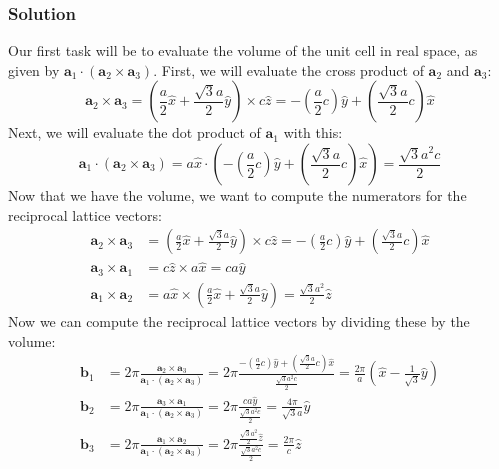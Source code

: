 \documentclass[12pt]{article}
\begin{document}
\subsubsection{Solution}
Our first task will be to evaluate the volume of the unit cell in real space, as given by $\mathbf{a}_1 \cdot\left(\mathbf{a}_2 \times \mathbf{a}_3\right)$. First, we will evaluate the cross product of $\mathbf{a}_2$ and $\mathbf{a}_3$:
\begin{equation}
    \mathbf{a}_2 \times \mathbf{a}_3 = \left(\frac{a}{2} \hat{x}+\frac{\sqrt{3} a}{2} \hat{y}\right) \times c \hat{z} = -\left(\frac{a}{2}c\right) \hat{y} + \left(\frac{\sqrt{3} a}{2}c\right) \hat{x}
\end{equation}
Next, we will evaluate the dot product of $\mathbf{a}_1$ with this:
\begin{equation}
    \mathbf{a}_1 \cdot\left(\mathbf{a}_2 \times \mathbf{a}_3\right) = a \hat{x} \cdot \left(-\left(\frac{a}{2}c\right) \hat{y} + \left(\frac{\sqrt{3} a}{2}c\right) \hat{x}\right) = \frac{\sqrt{3} a^2 c}{2}
\end{equation}
Now that we have the volume, we want to compute the numerators for the reciprocal lattice vectors:
\begin{align}
    \mathbf{a}_2 \times \mathbf{a}_3 &= \left(\frac{a}{2} \hat{x}+\frac{\sqrt{3} a}{2} \hat{y}\right) \times c \hat{z} = -\left(\frac{a}{2}c\right) \hat{y} + \left(\frac{\sqrt{3} a}{2}c\right) \hat{x} \\
    \mathbf{a}_3 \times \mathbf{a}_1 &= c \hat{z} \times a \hat{x} = c a \hat{y} \\
    \mathbf{a}_1 \times \mathbf{a}_2 &= a \hat{x} \times \left(\frac{a}{2} \hat{x}+\frac{\sqrt{3} a}{2} \hat{y}\right) = \frac{\sqrt{3} a^2}{2} \hat{z}
\end{align}
Now we can compute the reciprocal lattice vectors by dividing these by the volume:
\begin{align}
    \mathbf{b}_1 &= 2 \pi \frac{\mathbf{a}_2 \times \mathbf{a}_3}{\mathbf{a}_1 \cdot\left(\mathbf{a}_2 \times \mathbf{a}_3\right)} = 2 \pi \frac{-\left(\frac{a}{2}c\right) \hat{y} + \left(\frac{\sqrt{3} a}{2}c\right) \hat{x}}{\frac{\sqrt{3} a^2 c}{2}} = \frac{2\pi}{a} \left(\hat{x} - \frac{1}{\sqrt{3}} \hat{y}\right) \\
    \mathbf{b}_2 &= 2 \pi \frac{\mathbf{a}_3 \times \mathbf{a}_1}{\mathbf{a}_1 \cdot\left(\mathbf{a}_2 \times \mathbf{a}_3\right)} = 2 \pi \frac{c a \hat{y}}{\frac{\sqrt{3} a^2 c}{2}} = \frac{4\pi}{\sqrt{3} a} \hat{y} \\
    \mathbf{b}_3 &= 2 \pi \frac{\mathbf{a}_1 \times \mathbf{a}_2}{\mathbf{a}_1 \cdot\left(\mathbf{a}_2 \times \mathbf{a}_3\right)} = 2 \pi \frac{\frac{\sqrt{3} a^2}{2} \hat{z}}{\frac{\sqrt{3} a^2 c}{2}} = \frac{2\pi}{c} \hat{z}
\end{align}
\end{document}
